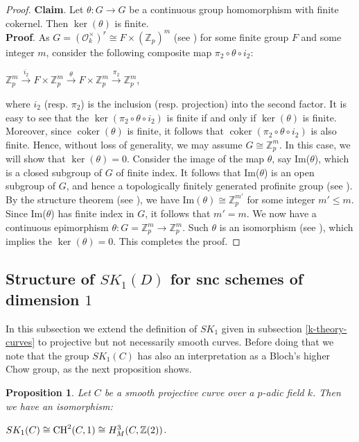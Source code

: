\documentclass[12pt]{amsart}
\newtheorem{prop}[prop]{Proposition}
\theoremstyle{remark}
\renewcommand{\1}{{\mathbb{S}}}
\newcommand{\CH}{{\rm CH}}
\newcommand{\<}{\langle}
\renewcommand{\>}{\rangle}
\newcommand{\cok}{{\operatorname{coker}}}
\begin{document}
\begin{proof}
\textbf{Claim}. Let $\theta : G \rightarrow G$ be a continuous group homomorphism with finite cokernel. Then $\ker(\theta)$ is finite.\\

\textbf{Proof}. As $G = (\mathcal{O}_{k}^{\times})^{r} \cong F \times (\mathbb{Z}_{p})^{m}$ (see \cite[Proposition II. 5.7]{Neu}) for some finite group $F$ and some integer $m$, consider the following composite map $\pi_{2} \circ \theta \circ i_{2}$:
\begin{center}
    $ \mathbb{Z}_{p}^{m} \xrightarrow{i_{2}} F \times \mathbb{Z}_{p}^{m}  \xrightarrow{\theta} F \times \mathbb{Z}_{p}^{m} \xrightarrow{\pi_{2}} \mathbb{Z}_{p}^{m}    $,
\end{center}
where $i_{2}$ (resp. $\pi_{2}$) is the inclusion (resp. projection) into the second factor. It is easy to see that the $\ker(\pi_{2} \circ \theta \circ i_{2})$ is finite if and only if $\ker(\theta)$ is finite. Moreover, since $\cok(\theta)$ is finite, it follows that $\cok(\pi_{2} \circ \theta \circ i_{2})$ is also finite. Hence, without loss of generality, we may assume $G \cong \mathbb{Z}_{p}^{m}$. In this case, we will show that $\ker(\theta) = 0$. Consider the image of the map $\theta$, say Im($\theta$), which is a closed subgroup of $G$ of finite index. It follows that Im($\theta$) is an open subgroup of $G$, and hence a topologically finitely generated profinite group (see \cite[Proposition 2.5.5]{RZ}). By the structure theorem (see \cite[Theorem 4.3.5]{RZ}), we have Im$(\theta) \cong \mathbb{Z}_{p}^{m'}$ for some integer $m' \leq m$. Since Im($\theta$) has finite index in $G$, it follows that $ m' = m$. We now have a continuous epimorphism $\theta : G = \mathbb{Z}_{p}^{m} \rightarrow \mathbb{Z}_{p}^{m} $. Such $\theta$ is an isomorphism (see \cite[Proposition 2.5.2]{RZ}), which implies the $\ker(\theta) = 0$. This completes the proof.  









\end{proof}

\subsection{Structure of $SK_1(D)$ for snc schemes of dimension $1$}\label{SK1(D)}
In this subsection 
we extend the definition of $SK_{1}$ given in subsection \ref{k-theory-curves} to projective but not necessarily smooth curves. 
Before doing that we note that 
the group $SK_1(C)$ has also an interpretation as a Bloch's higher Chow group, as the next proposition shows. 
\begin{prop}\label{prop:classgroup-chow-motivic}
Let $C$ be a smooth projective curve over a $p$-adic field $k$. Then we have an isomorphism:
\begin{center}
    $SK_{1}(C) \cong \CH^{2}(C, 1) \cong H_{M}^{3}(C, \mathbb{Z}(2))$.
\end{center}
\end{prop}
\end{document}
